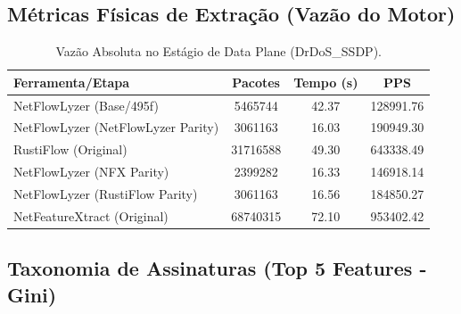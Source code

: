 \documentclass[11pt,a4paper]{article}
\begin{document}
\subsection{Métricas Físicas de Extração (Vazão do Motor)}
\begin{table}[H]
\centering
\begin{threeparttable}
\begin{tabular}{lccc}
\toprule
\textbf{Ferramenta/Etapa} & \textbf{Pacotes} & \textbf{Tempo (s)} & \textbf{PPS} \\
\midrule
NetFlowLyzer (Base/495f) & 5465744 & 42.37 & 128991.76 \\
NetFlowLyzer (NetFlowLyzer Parity) & 3061163 & 16.03 & 190949.30 \\
RustiFlow (Original) & 31716588 & 49.30 & 643338.49 \\
NetFlowLyzer (NFX Parity) & 2399282 & 16.33 & 146918.14 \\
NetFlowLyzer (RustiFlow Parity) & 3061163 & 16.56 & 184850.27 \\
NetFeatureXtract (Original) & 68740315 & 72.10 & 953402.42 \\
\bottomrule
\end{tabular}
\end{threeparttable}
\caption{Vazão Absoluta no Estágio de Data Plane (DrDoS\_SSDP).}
\end{table}

\subsection{Taxonomia de Assinaturas (Top 5 Features - Gini)}
\begin{table}[H]
\centering
{}
\caption{Principais atributos de correlação estocástica por limiar dimensional (DrDoS\_SSDP).}
\end{table}
\end{document}
